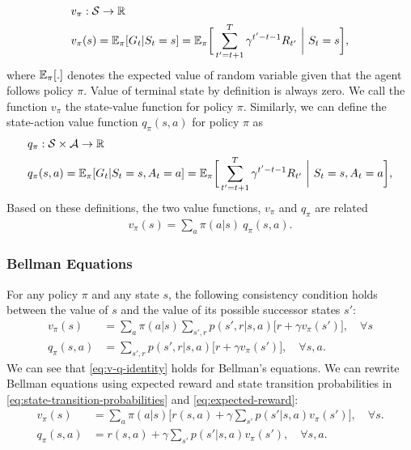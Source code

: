 \documentclass[letterpaper,titlepage]{article}
\begin{document}
\begin{equation} 
\begin{split}
v_{\pi}& :  \mathcal{S} \rightarrow \mathbb{R} \\
v_{\pi}& (s) = \mathbb{E}_{\pi} [G_t | S_t = s] = \mathbb{E}_{\pi} \bigg[ \sum_{t' = t + 1}^{T} \gamma^{t' - t - 1} R_{t'} ~ \bigg| ~  S_t = s \bigg],
\end{split}
\label{eq:state-value}
\end{equation}
where $\mathbb{E}_{\pi}[.]$ denotes the expected value of random variable given that the agent follows policy $\pi$. Value of terminal state by definition is always zero. We call the function $v_{\pi}$ the state-value function for policy $\pi$. Similarly, we can define the state-action value function $q_{\pi} (s,a)$ for policy $\pi$ as 
\begin{equation} 
\begin{split}
q_{\pi}& :  \mathcal{S} \times \mathcal{A} \rightarrow \mathbb{R} \\
q_{\pi}& (s,a) = \mathbb{E}_{\pi} [G_t | S_t = s, A_t = a] = \mathbb{E}_{\pi} \bigg[ \sum_{t' = t + 1}^{T} \gamma^{t' - t - 1} R_{t'} ~ \bigg| ~  S_t = s, A_t = a \bigg],
\end{split}
\label{eq:state-action-value}
\end{equation}
Based on these definitions, the two value functions, $v_{\pi}$ and $q_{\pi}$ are related
\begin{align}
v_{\pi}(s) = \sum_{a} \pi( a | s ) ~ q_{\pi} (s,a).
\label{eq:v-q-identity}
\end{align}
\subsubsection*{Bellman Equations}
For any policy $\pi$ and any state $s$, the following consistency condition holds between the value of $s$ and the value of its possible successor states $s'$:
\begin{align}
v_{\pi}(s) &= \sum_{a} \pi(a | s) \sum_{s',r} p(s',r | s, a) \big[ r + \gamma v_{\pi} (s') \big], \quad \forall s \\
q_{\pi}(s,a) &=  \sum_{s',r} p(s',r | s, a) \big[ r + \gamma v_{\pi} (s') \big], \quad \forall s,a. 
\end{align}
We can see that \eqref{eq:v-q-identity} holds for Bellman's equations. We can rewrite Bellman equations using expected reward and state transition probabilities in \eqref{eq:state-transition-probabilities} and \eqref{eq:expected-reward}:
\begin{align}
v_{\pi}(s) &= \sum_{a} \pi(a | s) \big[ r(s,a) + \gamma \sum_{s'} p(s'| s, a)  v_{\pi} (s') \big], \quad \forall s. \\
q_{\pi}(s,a) &=  r(s,a) + \gamma \sum_{s'} p(s'| s, a)  v_{\pi} (s'), \quad \forall s,a.
\end{align}
\end{document}

